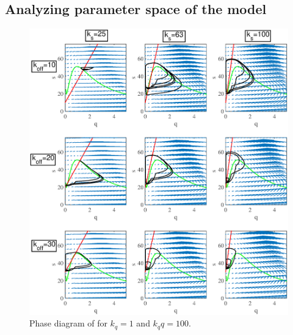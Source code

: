 \subsection{Analyzing parameter space of the model}

\begin{figure}[h!]
\centering
\includegraphics[width=\hsize]{pulse/phase_tester.eps}
\caption{\label{fig:pulse_fit}  Phase diagram of for $k_q=1$ and $k_qq=100$.}
\end{figure}

